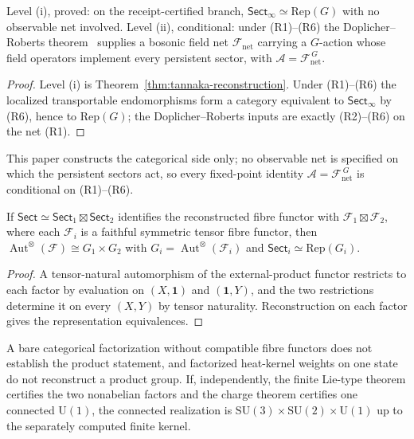 \documentclass[11pt]{article}
\begin{document}
\begin{corollary}
Level (i), proved: on the receipt-certified branch,
\(\mathsf{Sect}_\infty\simeq\mathrm{Rep}(G)\) with no observable net
involved. Level (ii), conditional: under (R1)--(R6) the
Doplicher--Roberts theorem~\cite{dr89,dr90} supplies a bosonic field net
\(\mathcal F_{\mathrm{net}}\) carrying a \(G\)-action whose field operators
implement every persistent sector, with
\(\mathcal A=\mathcal F_{\mathrm{net}}^{\,G}\).
\end{corollary}

\begin{proof}
Level (i) is Theorem~\ref{thm:tannaka-reconstruction}. Under (R1)--(R6) the
localized transportable endomorphisms form a category equivalent to
\(\mathsf{Sect}_\infty\) by (R6), hence to \(\mathrm{Rep}(G)\); the
Doplicher--Roberts inputs are exactly (R2)--(R6) on the net (R1).
\end{proof}

This paper constructs the categorical side only; no observable net is
specified on which the persistent sectors act, so every fixed-point identity
\(\mathcal A=\mathcal F_{\mathrm{net}}^{\,G}\) is conditional on (R1)--(R6).

\begin{lemma}
\label{lem:product-factorization}
If \(\mathsf{Sect}\simeq\mathsf{Sect}_1\boxtimes\mathsf{Sect}_2\) identifies
the reconstructed fibre functor with \(\mathcal F_1\boxtimes\mathcal F_2\),
where each \(\mathcal F_i\) is a faithful symmetric tensor fibre functor, then
\(\operatorname{Aut}^{\otimes}(\mathcal F)\cong G_1\times G_2\) with
\(G_i=\operatorname{Aut}^{\otimes}(\mathcal F_i)\) and
\(\mathsf{Sect}_i\simeq\mathrm{Rep}(G_i)\).
\end{lemma}

\begin{proof}
A tensor-natural automorphism of the external-product functor restricts to
each factor by evaluation on \((X,\mathbf 1)\) and \((\mathbf 1,Y)\), and the
two restrictions determine it on every \((X,Y)\) by tensor naturality.
Reconstruction on each factor gives the representation equivalences.
\end{proof}

A bare categorical factorization without compatible fibre functors does not
establish the product statement, and factorized heat-kernel weights on one
state do not reconstruct a product group. If, independently, the finite
Lie-type theorem certifies the two nonabelian factors and the charge theorem
certifies one connected \(\mathrm U(1)\), the connected realization is
\(\mathrm{SU}(3)\times\mathrm{SU}(2)\times\mathrm U(1)\) up to the separately
computed finite kernel.
\end{document}
